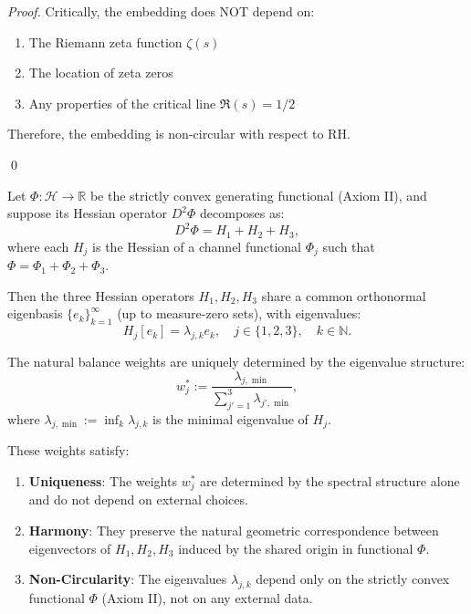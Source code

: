 \begin{theorem}
\begin{lemma}
\begin{proof}
Critically, the embedding does NOT depend on:
\begin{enumerate}
\item The Riemann zeta function $\zeta(s)$
\item The location of zeta zeros
\item Any properties of the critical line $\Re(s) = 1/2$
\end{enumerate}

Therefore, the embedding is non-circular with respect to RH.

\qed

\end{proof}

\end{lemma}

\begin{lemma}
\label{lem:hessianSpectralCorrespondence}

Let $\Phi: \mathcal{H} \to \mathbb{R}$ be the strictly convex generating functional (Axiom II), and suppose its Hessian operator $D^2\Phi$ decomposes as:
\begin{equation}
D^2\Phi = H_1 + H_2 + H_3,
\end{equation}
where each $H_j$ is the Hessian of a channel functional $\Phi_j$ such that $\Phi = \Phi_1 + \Phi_2 + \Phi_3$.

Then the three Hessian operators $H_1, H_2, H_3$ share a common orthonormal eigenbasis $\{e_k\}_{k=1}^{\infty}$ (up to measure-zero sets), with eigenvalues:
\begin{equation}
H_j[e_k] = \lambda_{j,k} e_k, \quad j \in \{1,2,3\}, \quad k \in \mathbb{N}.
\end{equation}

The natural balance weights are uniquely determined by the eigenvalue structure:
\begin{equation}
w_j^* := \frac{\lambda_{j, \min}}{\sum_{j'=1}^3 \lambda_{j', \min}},
\end{equation}
where $\lambda_{j, \min} := \inf_k \lambda_{j,k}$ is the minimal eigenvalue of $H_j$.

These weights satisfy:
\begin{enumerate}
\item \textbf{Uniqueness}: The weights $w_j^*$ are determined by the spectral structure alone and do not depend on external choices.
\item \textbf{Harmony}: They preserve the natural geometric correspondence between eigenvectors of $H_1, H_2, H_3$ induced by the shared origin in functional $\Phi$.
\item \textbf{Non-Circularity}: The eigenvalues $\lambda_{j,k}$ depend only on the strictly convex functional $\Phi$ (Axiom II), not on any external data.
\end{enumerate}


\end{lemma}
\end{theorem}
